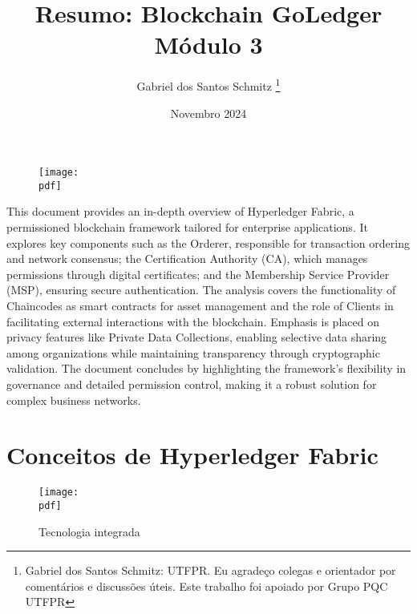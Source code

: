 \documentclass[letterpaper,11pt,leqno]{article}
\newcommand{\pdf}{figures/figures}
\begin{document}
\begin{figure}[t]
	{\texttt{[image: \\pdf]}}
	\vspace{-50pt}
	\label{f:logo}\end{figure}

\title{Resumo: Blockchain GoLedger Módulo 3}

\author{Gabriel dos Santos Schmitz
	\thanks{Gabriel dos Santos Schmitz: UTFPR. Eu agradeço colegas e orientador
		por comentários e discussões úteis. Este trabalho foi apoiado por Grupo PQC
		UTFPR}}

\date{Novembro 2024}


\begin{titlepage}

	\maketitle

	This document provides an in-depth overview of Hyperledger Fabric, a
	permissioned blockchain framework tailored for enterprise applications. It
	explores key components such as the Orderer, responsible for transaction
	ordering and network consensus; the Certification Authority (CA), which
	manages permissions through digital certificates; and the Membership Service
	Provider (MSP), ensuring secure authentication. The analysis covers the
	functionality of Chaincodes as smart contracts for asset management and the
	role of Clients in facilitating external interactions with the blockchain.
	Emphasis is placed on privacy features like Private Data Collections, enabling
	selective data sharing among organizations while maintaining transparency
	through cryptographic validation. The document concludes by highlighting the
	framework’s flexibility in governance and detailed permission control, making
	it a robust solution for complex business networks.

\end{titlepage}

\section{Conceitos de Hyperledger Fabric}

\begin{figure}[H]
	{\texttt{[image: \\pdf]}}
	\caption{Tecnologia integrada}
	\label{f:figure1}\end{figure}
\end{document}
